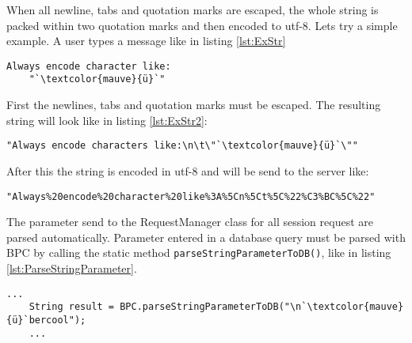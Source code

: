\documentclass[12pt,a4paper,oneside]{report}
\newcommand{\code}[1]{\lstinline{#1}}
\begin{document}
When all newline, tabs and quotation marks are escaped, the whole string is packed within two quotation marks and then encoded to utf-8.
Lets try a simple example. A user types a message like in listing \ref{lst:ExStr}

\begin{lstlisting}[caption=Example string, label=lst:ExStr]
Always encode character like:
	"`\textcolor{mauve}{ü}`"
\end{lstlisting}

First the newlines, tabs and quotation marks must be escaped. The resulting string will look like in listing \ref{lst:ExStr2}:

\begin{lstlisting}[caption=Escaped character, label=lst:ExStr2]
"Always encode characters like:\n\t\"`\textcolor{mauve}{ü}`\""
\end{lstlisting}

After this the string is encoded in utf-8 and will be send to the server like:

\begin{lstlisting}[caption=UTF-8 encoded string, label=lst:ExStr3]
"Always%20encode%20character%20like%3A%5Cn%5Ct%5C%22%C3%BC%5C%22"
\end{lstlisting}

The parameter send to the RequestManager class for all session request are parsed automatically. Parameter entered in a database query must be parsed with BPC by calling the static method \code{parseStringParameterToDB()}, like in listing \ref{lst:ParseStringParameter}.
\begin{lstlisting}[caption=Parse a string parameter, label=lst:ParseStringParameter]
	...
	String result = BPC.parseStringParameterToDB("\n`\textcolor{mauve}{ü}`bercool");
	...
\end{lstlisting}
\end{document}
